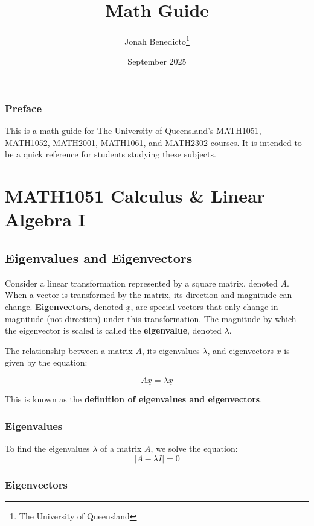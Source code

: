 \documentclass[12pt, letterpaper]{book}
\title{Math Guide}
\author{Jonah Benedicto\thanks{The University of Queensland}}
\date{September 2025}
\begin{document}
\maketitle

\tableofcontents

\newpage

\section*{Preface}
This is a math guide for The University of Queensland's MATH1051, MATH1052, MATH2001, MATH1061, and MATH2302 courses. It is intended to be a quick reference for students studying these subjects.

\part{MATH1051 Calculus \& Linear Algebra I}

\chapter{Eigenvalues and Eigenvectors}

Consider a linear transformation represented by a square matrix, denoted $A$. When a vector is transformed by the matrix, its direction and magnitude can change. \textbf{Eigenvectors}, denoted $\underline{x}$, are special vectors that only change in magnitude (not direction) under this transformation. The magnitude by which the eigenvector is scaled is called the \textbf{eigenvalue}, denoted $\lambda$.

The relationship between a matrix $A$, its eigenvalues $\lambda$, and eigenvectors $\underline{x}$ is given by the equation:

$$A \underline{x} = \lambda \underline{x}$$

This is known as the \textbf{definition of eigenvalues and eigenvectors}.

\section{Eigenvalues}

To find the eigenvalues $\lambda$ of a matrix $A$, we solve the equation:
$$|A - \lambda I| = 0$$

\section{Eigenvectors}
\end{document}
